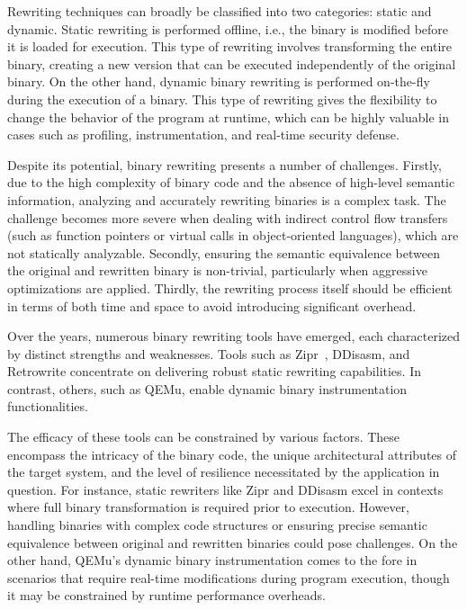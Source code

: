 \documentclass[a4paper,11pt,oneside]{report}
\begin{document}
Rewriting techniques can broadly be classified into two categories: static and
dynamic. Static rewriting is performed offline, i.e., the binary is modified before it is loaded
for execution. This type of rewriting involves transforming the entire binary, creating a new
version that can be executed independently of the original binary. On the other hand,
dynamic binary rewriting is performed on-the-fly during the execution of a binary. This type
of rewriting gives the flexibility to change the behavior of the program at runtime, which can
be highly valuable in cases such as profiling, instrumentation, and real-time security
defense.

Despite its potential, binary rewriting presents a number of challenges. Firstly, due
to the high complexity of binary code and the absence of high-level semantic information,
analyzing and accurately rewriting binaries is a complex task. The challenge becomes more
severe when dealing with indirect control flow transfers (such as function pointers or virtual
calls in object-oriented languages), which are not statically analyzable. Secondly, ensuring
the semantic equivalence between the original and rewritten binary is non-trivial,
particularly when aggressive optimizations are applied. Thirdly, the rewriting process itself
should be efficient in terms of both time and space to avoid introducing significant
overhead.

Over the years, numerous binary rewriting tools have emerged, each characterized
by distinct strengths and weaknesses. Tools such as Zipr~\cite{ziprpaper}, DDisasm, and Retrowrite
concentrate on delivering robust static rewriting capabilities. In contrast, others, such as
QEMu, enable dynamic binary instrumentation functionalities.

The efficacy of these tools can be constrained by various factors. These encompass
the intricacy of the binary code, the unique architectural attributes of the target system,
and the level of resilience necessitated by the application in question. For instance, static
rewriters like Zipr and DDisasm excel in contexts where full binary transformation is
required prior to execution. However, handling binaries with complex code structures or
ensuring precise semantic equivalence between original and rewritten binaries could pose
challenges. On the other hand, QEMu's dynamic binary instrumentation comes to the fore in
scenarios that require real-time modifications during program execution, though it may be
constrained by runtime performance overheads.
\end{document}
